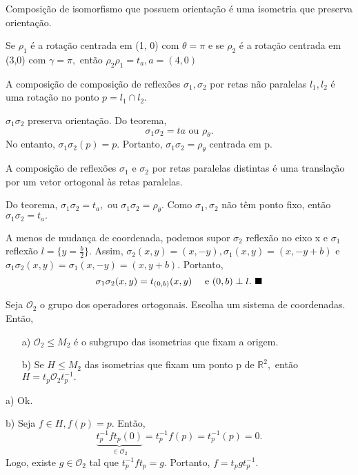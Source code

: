\documentclass[algebra_notes.tex]{subfiles}
\begin{document}
\begin{proof*}
	Composição de isomorfismo que possuem orientação é uma isometria que preserva orientação.
\end{proof*}
\begin{example*}
	Se $\rho _{1}$ é a rotação centrada em (1, 0) com $\theta = \pi $ e se $\rho _{2}$ é a rotação centrada em (3,0) com
	$\gamma =\pi ,$ então $\rho _{2}\rho _{1}=t_{a}, a = (4, 0)$ \qedsymbol
\end{example*}
\begin{crl*}
	A composição de composição de reflexões $\sigma _{1}, \sigma _{2}$ por retas não paralelas $l_{1}, l_{2}$ é uma rotação no ponto
	$p=l_{1}\cap l_{2}.$
\end{crl*}
\begin{proof*}
	$\sigma_{1}\sigma _{2}$ preserva orientação. Do teorema,
	$$
		\sigma _{1}\sigma _{2} = ta\text{ ou } \rho _{\theta }.
	$$
	No entanto, $\sigma _{1}\sigma _{2}(p) = p.$ Portanto, $\sigma _{1}\sigma _{2} = \rho _{\theta }$ centrada em p. \qedsymbol
\end{proof*}
\begin{crl*}
	A composição de reflexões $\sigma _{1}$ e $\sigma _{2}$ por retas paralelas distintas é uma translação por um vetor ortogonal
	às retas paralelas.
\end{crl*}
\begin{proof*}
	Do teorema, $\sigma _{1}\sigma _{2} = t_{a},$ ou $\sigma _{1}\sigma _{2} = \rho _{\theta }.$ Como $\sigma _{1}, \sigma _{2}$
	não têm ponto fixo, então $\sigma _{1}\sigma _{2} = t_{a}.$

	A menos de mudança de coordenada, podemos supor $\sigma _{2}$ reflexão no eixo x e $\sigma _{1}$ reflexão $l=\{y=\frac{b}{2}\}.$ Assim,
	$\sigma _{2}(x, y) = (x, -y), \sigma _{1}(x,y) = (x, -y+b)$ e $\sigma _{1}\sigma _{2}(x, y)=\sigma _{1}(x, -y) = (x, y+b).$ Portanto,
	$$
		\sigma _{1}\sigma _{2}(x,y) = t_{(0, b)}(x,y)\quad\text{ e }(0,b)\perp l.\text{ $\blacksquare$}
	$$
\end{proof*}
\begin{prop*}
	Seja $\mathcal{O}_{2}$ o grupo dos operadores ortogonais. Escolha um sistema de coordenadas. Então,
	\begin{itemize}
		\item[a)] $\mathcal{O}_{2}\leq M_{2}$ é o subgrupo das isometrias que fixam a origem.
		\item[b)] Se $H\leq M_{2}$ das isometrias que fixam um ponto p de $\mathbb{R}^{2},$ então $H = t_{p}\mathcal{O}_{2}t_{p}^{-1}.$
	\end{itemize}
\end{prop*}
\begin{proof*}
	a) Ok.

	b) Seja $f\in H, f(p) = p.$ Então,
	$$
		\underbrace{t_{p}^{-1}ft_{p}(0)}_{\in \mathcal{O}_{2}} = t_{p}^{-1}f(p) = t_{p}^{-1}(p) = 0.
	$$
	Logo, existe $g\in \mathcal{O}_{2}$ tal que $t_{p}^{-1}ft_{p} = g.$ Portanto, $f = t_{p}gt_{p}^{-1}.$ \qedsymbol
\end{proof*}
\end{document}
